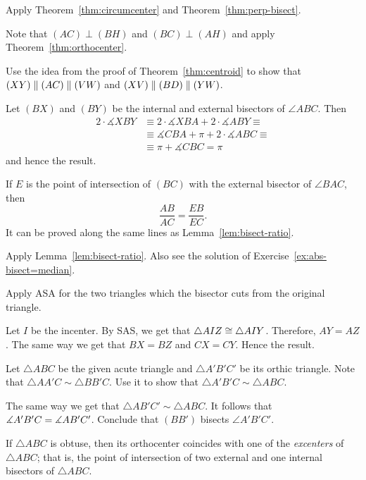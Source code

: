 Apply Theorem~\ref{thm:circumcenter} and Theorem~\ref{thm:perp-bisect}.

Note that $(AC)\perp (BH)$ and $(BC)\perp (AH)$ and apply Theorem~\ref{thm:orthocenter}.

Use the idea from the proof of Theorem~\ref{thm:centroid}
to show that $(XY)\parallel (AC)\z\parallel (VW)$ and
$(XV)\parallel (BD)\z\parallel (YW)$.

Let $(BX)$ and $(BY)$ be the internal and external bisectors of $\angle ABC$.
Then 
\begin{align*}
2\cdot \measuredangle XBY&\equiv2\cdot \measuredangle XBA+2\cdot \measuredangle ABY\equiv
\\
&\equiv\measuredangle CBA+\pi+2\cdot \measuredangle ABC\equiv
\\
&\equiv \pi+\measuredangle CBC=\pi
\end{align*}
and hence the result.

If $E$ is the point of intersection of $(BC)$ 
with the external bisector of $\angle BAC$, then 
$$\frac{AB}{AC}=\frac{EB}{EC}.$$
It can be proved along the same lines as Lemma~\ref{lem:bisect-ratio}.

Apply Lemma~\ref{lem:bisect-ratio}.
Also see the solution of Exercise~\ref{ex:abs-bisect=median}.

Apply ASA for the two triangles which the bisector cuts from the original triangle. 

Let $I$ be the incenter.
By SAS, we get that $\triangle AIZ\z\cong\triangle AIY$.
Therefore, $AY=AZ$.
The same way we get that $BX=BZ$ and $CX=CY$.
Hence the result.

Let $\triangle ABC$ be the given acute triangle and $\triangle A'B'C'$ 
be its orthic triangle.
Note that $\triangle AA'C\sim\triangle BB'C$.
Use it to show that $\triangle A'B'C\sim \triangle ABC$.

The same way we get that $\triangle AB'C'\sim \triangle ABC$.
It follows that $\measuredangle A'B'C\z=\measuredangle AB'C'$.
Conclude that $(BB')$ bisects $\angle A'B'C'$.

If $\triangle ABC$ is obtuse, then its orthocenter coincides with one of the \emph{excenters} of $\triangle ABC$;
that is, 
the point of intersection of two external and one internal bisectors of $\triangle ABC$.
 
